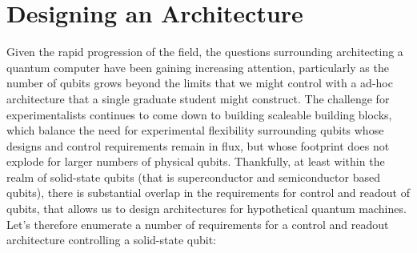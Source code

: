 \section{Designing an Architecture}
Given the rapid progression of the field, the questions surrounding architecting a quantum computer have been gaining increasing attention,
particularly as the number of qubits grows beyond the limits that we might control with a ad-hoc architecture that a single graduate student might construct.
The challenge for experimentalists continues to come down to building scaleable building blocks, which balance the need for experimental
flexibility surrounding qubits whose designs and control requirements remain in flux, but whose footprint does not explode for larger numbers
of physical qubits. Thankfully, at least within the realm of solid-state qubits (that is superconductor and semiconductor based qubits),
there is substantial overlap in the requirements for control and readout of qubits, that allows us to design architectures for hypothetical
quantum machines. Let's therefore enumerate a number of requirements for a control and readout architecture controlling a solid-state qubit:
